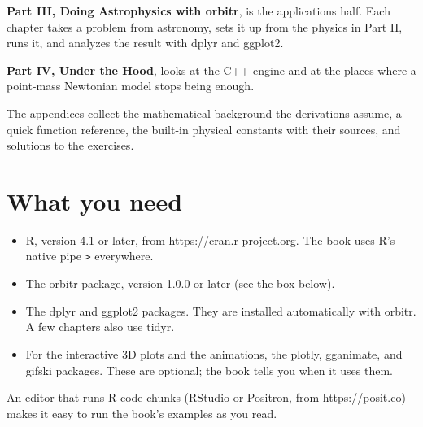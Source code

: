 \documentclass[
  10.5pt,
  letterpaper,
]{scrbook}
\providecommand{\tightlist}{%
  \setlength{\itemsep}{0pt}\setlength{\parskip}{0pt}}
\theoremstyle{definition}
\theoremstyle{plain}
\theoremstyle{remark}
\begin{document}
\textbf{Part III, Doing Astrophysics with orbitr}, is the applications
half. Each chapter takes a problem from astronomy, sets it up from the
physics in Part II, runs it, and analyzes the result with dplyr and
ggplot2.

\textbf{Part IV, Under the Hood}, looks at the C++ engine and at the
places where a point-mass Newtonian model stops being enough.

The appendices collect the mathematical background the derivations
assume, a quick function reference, the built-in physical constants with
their sources, and solutions to the exercises.

\section*{What you need}\label{what-you-need}


\begin{itemize}
\tightlist
\item
  R, version 4.1 or later, from \url{https://cran.r-project.org}. The
  book uses R's native pipe \texttt{\textbar{}\textgreater{}}
  everywhere.
\item
  The orbitr package, version 1.0.0 or later (see the box below).
\item
  The dplyr and ggplot2 packages. They are installed automatically with
  orbitr. A few chapters also use tidyr.
\item
  For the interactive 3D plots and the animations, the plotly,
  gganimate, and gifski packages. These are optional; the book tells you
  when it uses them.
\end{itemize}

An editor that runs R code chunks (RStudio or Positron, from
\url{https://posit.co}) makes it easy to run the book's examples as you
read.
\end{document}
